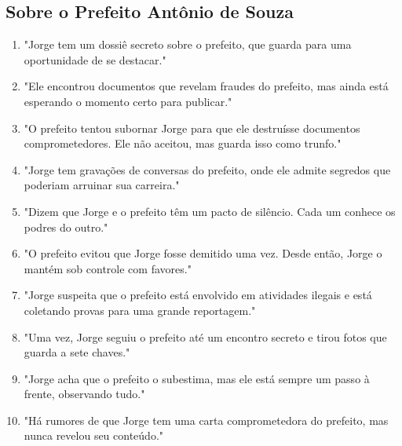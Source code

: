 \subsection*{Sobre o Prefeito Antônio de Souza}
\begin{enumerate}
    \item "Jorge tem um dossiê secreto sobre o prefeito, que guarda para uma oportunidade de se destacar."
    \item "Ele encontrou documentos que revelam fraudes do prefeito, mas ainda está esperando o momento certo para publicar."
    \item "O prefeito tentou subornar Jorge para que ele destruísse documentos comprometedores. Ele não aceitou, mas guarda isso como trunfo."
    \item "Jorge tem gravações de conversas do prefeito, onde ele admite segredos que poderiam arruinar sua carreira."
    \item "Dizem que Jorge e o prefeito têm um pacto de silêncio. Cada um conhece os podres do outro."
    \item "O prefeito evitou que Jorge fosse demitido uma vez. Desde então, Jorge o mantém sob controle com favores."
    \item "Jorge suspeita que o prefeito está envolvido em atividades ilegais e está coletando provas para uma grande reportagem."
    \item "Uma vez, Jorge seguiu o prefeito até um encontro secreto e tirou fotos que guarda a sete chaves."
    \item "Jorge acha que o prefeito o subestima, mas ele está sempre um passo à frente, observando tudo."
    \item "Há rumores de que Jorge tem uma carta comprometedora do prefeito, mas nunca revelou seu conteúdo."
\end{enumerate}

